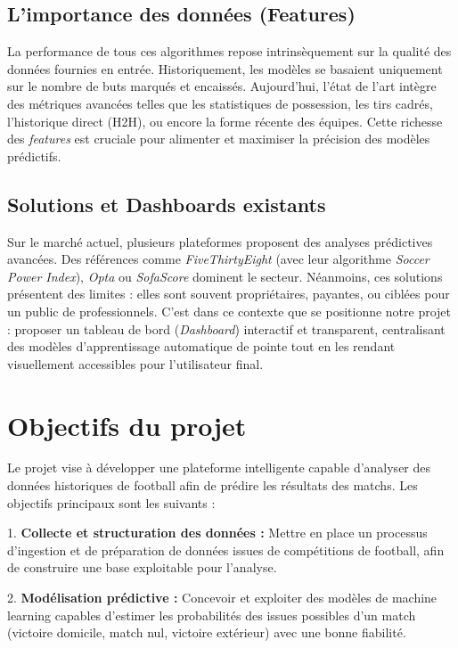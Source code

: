 \subsection{L'importance des données (Features)}
La performance de tous ces algorithmes repose intrinsèquement sur la qualité des données fournies en entrée. Historiquement, les modèles se basaient uniquement sur le nombre de buts marqués et encaissés. Aujourd'hui, l'état de l'art intègre des métriques avancées telles que les statistiques de possession, les tirs cadrés, l'historique direct (H2H), ou encore la forme récente des équipes. Cette richesse des \textit{features} est cruciale pour alimenter et maximiser la précision des modèles prédictifs.

\subsection{Solutions et Dashboards existants}
Sur le marché actuel, plusieurs plateformes proposent des analyses prédictives avancées. Des références comme \textit{FiveThirtyEight} (avec leur algorithme \textit{Soccer Power Index}), \textit{Opta} ou \textit{SofaScore} dominent le secteur. Néanmoins, ces solutions présentent des limites : elles sont souvent propriétaires, payantes, ou ciblées pour un public de professionnels. 
C'est dans ce contexte que se positionne notre projet : proposer un tableau de bord (\textit{Dashboard}) interactif et transparent, centralisant des modèles d'apprentissage automatique de pointe tout en les rendant visuellement accessibles pour l'utilisateur final.


\section{Objectifs du projet}

Le projet vise à développer une plateforme intelligente capable d’analyser des données historiques de football afin de prédire les résultats des matchs. Les objectifs principaux sont les suivants :

1. \textbf{Collecte et structuration des données :} Mettre en place un processus d’ingestion et de préparation de données issues de compétitions de football, afin de construire une base exploitable pour l’analyse.

2. \textbf{Modélisation prédictive :} Concevoir et exploiter des modèles de machine learning capables d’estimer les probabilités des issues possibles d’un match (victoire domicile, match nul, victoire extérieur) avec une bonne fiabilité.

